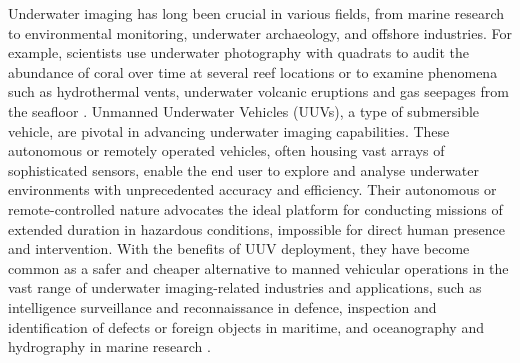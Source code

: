Underwater imaging has long been crucial in various fields, from marine research to environmental monitoring, underwater archaeology, and offshore industries. For example, scientists use underwater photography with quadrats to audit the abundance of coral over time at several reef locations or to examine phenomena such as hydrothermal vents, underwater volcanic eruptions and gas seepages from the seafloor \cite{universityofhawaiiPracticesScienceUnderwater}. Unmanned Underwater Vehicles (UUVs), a type of submersible vehicle, are pivotal in advancing underwater imaging capabilities. These autonomous or remotely operated vehicles, often housing vast arrays of sophisticated sensors, enable the end user to explore and analyse underwater environments with unprecedented accuracy and efficiency. Their autonomous or remote-controlled nature advocates the ideal platform for conducting missions of extended duration in hazardous conditions, impossible for direct human presence and intervention. With the benefits of UUV deployment, they have become common as a safer and cheaper alternative to manned vehicular operations in the vast range of underwater imaging-related industries and applications, such as intelligence surveillance and reconnaissance in defence, inspection and identification of defects or foreign objects in maritime, and oceanography and hydrography in marine research \cite{yannickallardUnmannedUnderwaterVehicle2014}.

